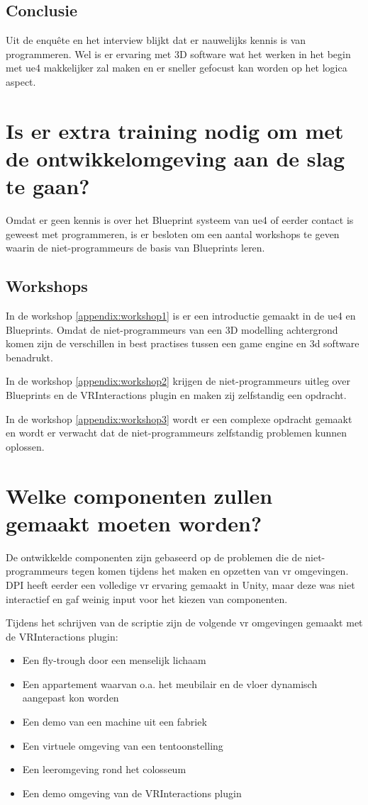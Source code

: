 \subsection{Conclusie}
Uit de enquête en het interview blijkt dat er nauwelijks kennis is van programmeren. Wel is er ervaring met 3D software wat het werken in het begin met \gls{ue4} makkelijker zal maken en er sneller gefocust kan worden op het logica aspect.

\section{Is er extra training nodig om met de ontwikkelomgeving aan de slag te gaan?}
Omdat er geen kennis is over het Blueprint systeem van \gls{ue4} of eerder contact is geweest met programmeren, is er besloten om een aantal workshops te geven waarin de niet-programmeurs de basis van Blueprints leren.

\subsection{Workshops}
In de workshop \ref{appendix:workshop1} is er een introductie gemaakt in de \gls{ue4} en Blueprints. Omdat de niet-programmeurs van een 3D modelling achtergrond komen zijn de verschillen in best practises tussen een game engine en 3d software benadrukt.

In de workshop \ref{appendix:workshop2} krijgen de niet-programmeurs uitleg over Blueprints en de VRInteractions plugin en maken zij zelfstandig een opdracht.

In de workshop \ref{appendix:workshop3} wordt er een complexe opdracht gemaakt en wordt er verwacht dat de niet-programmeurs zelfstandig problemen kunnen oplossen.

\section{Welke componenten zullen gemaakt moeten worden?}
\label{sec:welkeComponenten}
De ontwikkelde componenten zijn gebaseerd op de problemen die de niet-programmeurs tegen komen tijdens het maken en opzetten van \gls{vr} omgevingen. DPI heeft eerder een volledige \gls{vr} ervaring gemaakt in Unity, maar deze was niet interactief en gaf weinig input voor het kiezen van componenten. 

Tijdens het schrijven van de scriptie zijn de volgende \gls{vr} omgevingen gemaakt met de VRInteractions plugin:

\begin{itemize}
	\item Een fly-trough door een menselijk lichaam
	\item Een appartement waarvan o.a. het meubilair en de vloer dynamisch aangepast kon worden
	\item Een demo van een machine uit een fabriek
	\item Een virtuele omgeving van een tentoonstelling
	\item Een leeromgeving rond het colosseum
	\item Een demo omgeving van de VRInteractions plugin
\end{itemize}

